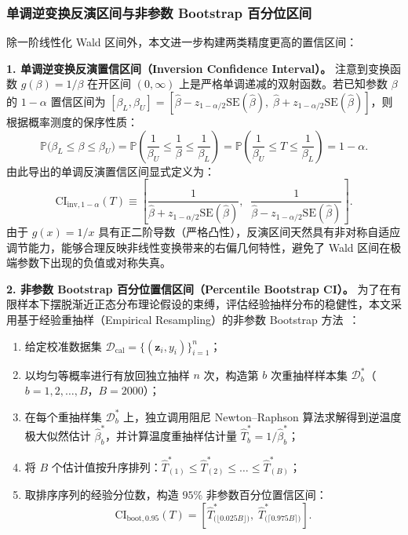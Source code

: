 \subsubsection{单调逆变换反演区间与非参数 Bootstrap 百分位区间}

除一阶线性化 Wald 区间外，本文进一步构建两类精度更高的置信区间：

\textbf{1. 单调逆变换反演置信区间（Inversion Confidence Interval）。}
注意到变换函数 $g(\beta) = 1/\beta$ 在开区间 $(0, \infty)$ 上是严格单调递减的双射函数。若已知参数 $\beta$ 的 $1-\alpha$ 置信区间为 $[\beta_L, \beta_U] = [\hat\beta - z_{1-\alpha/2}\mathrm{SE}(\hat\beta), \; \hat\beta + z_{1-\alpha/2}\mathrm{SE}(\hat\beta)]$，则根据概率测度的保序性质：
\[
\mathbb{P}\big(\beta_L \le \beta \le \beta_U\big) = \mathbb{P}\left(\frac{1}{\beta_U} \le \frac{1}{\beta} \le \frac{1}{\beta_L}\right) = \mathbb{P}\left(\frac{1}{\beta_U} \le T \le \frac{1}{\beta_L}\right) = 1 - \alpha.
\]
由此导出的单调反演置信区间显式定义为：
\begin{equation}\label{eq:inversion_ci}
\mathrm{CI}_{\mathrm{inv}, 1-\alpha}(T) \equiv \left[ \frac{1}{\hat\beta + z_{1-\alpha/2}\mathrm{SE}(\hat\beta)}, \;\; \frac{1}{\hat\beta - z_{1-\alpha/2}\mathrm{SE}(\hat\beta)} \right].
\end{equation}
由于 $g(x) = 1/x$ 具有正二阶导数（严格凸性），反演区间天然具有非对称自适应调节能力，能够合理反映非线性变换带来的右偏几何特性，避免了 Wald 区间在极端参数下出现的负值或对称失真。

\textbf{2. 非参数 Bootstrap 百分位置信区间（Percentile Bootstrap CI）。}
为了在有限样本下摆脱渐近正态分布理论假设的束缚，评估经验抽样分布的稳健性，本文采用基于经验重抽样（Empirical Resampling）的非参数 Bootstrap 方法~\cite{efron1994introduction}：
\begin{enumerate}
\item 给定校准数据集 $\mathcal{D}_{\mathrm{cal}} = \{(\boldsymbol{z}_i, y_i)\}_{i=1}^n$；
\item 以均匀等概率进行有放回独立抽样 $n$ 次，构造第 $b$ 次重抽样样本集 $\mathcal{D}^*_b$（$b = 1, 2, \dots, B$，$B = 2000$）；
\item 在每个重抽样集 $\mathcal{D}^*_b$ 上，独立调用阻尼 Newton--Raphson 算法求解得到逆温度极大似然估计 $\hat\beta^*_b$，并计算温度重抽样估计量 $\hat T^*_b = 1/\hat\beta^*_b$；
\item 将 $B$ 个估计值按升序排列：$\hat T^*_{(1)} \le \hat T^*_{(2)} \le \dots \le \hat T^*_{(B)}$；
\item 取排序序列的经验分位数，构造 $95\%$ 非参数百分位置信区间：
\begin{equation}\label{eq:bootstrap_ci}
\mathrm{CI}_{\mathrm{boot}, 0.95}(T) = \left[ \hat T^*_{\big(\lfloor 0.025 B \rfloor\big)}, \; \hat T^*_{\big(\lceil 0.975 B \rceil\big)} \right].
\end{equation}
\end{enumerate}

